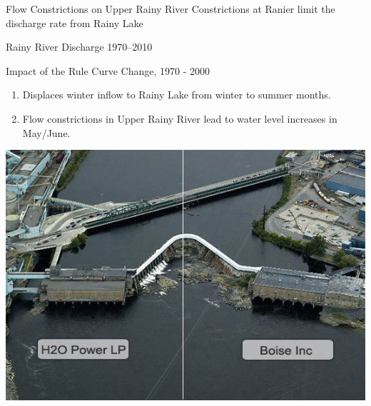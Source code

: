 \documentclass[compress,english]{beamer}
\begin{document}
{{{{\begin{frame}{Flow Constrictions on Upper Rainy River}
Constrictions at Ranier limit the discharge rate from Rainy Lake
\begin{center}
\end{center}

\end{frame}

\begin{frame}{Rainy River Discharge 1970--2010}

\begin{center}
\end{center}

\end{frame}

\begin{frame}{Impact of the Rule Curve Change, 1970 - 2000}

\begin{enumerate}
\item Displaces winter inflow to Rainy Lake from winter to summer months.
\item Flow constrictions in Upper Rainy River lead to water level increases in May/June.
\end{enumerate}

\end{frame}


{\usebackgroundtemplate%
	{\includegraphics[height=\paperheight]{fort-frances-split.jpg}}
}}}}}
\end{document}

